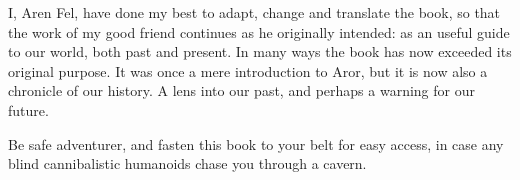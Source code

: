 I, Aren Fel, have done my best to adapt, change and translate the
book, so that the work of my good friend continues as he originally
intended: as an useful guide to our world, both past and present. In
many ways the book has now exceeded its original purpose. It was once
a mere introduction to Aror, but it is now also a chronicle of our
history. A lens into our past, and perhaps a warning for our future.

Be safe adventurer, and fasten this book to your belt for easy access,
in case any blind cannibalistic humanoids chase you through a cavern.
\twocolumn
